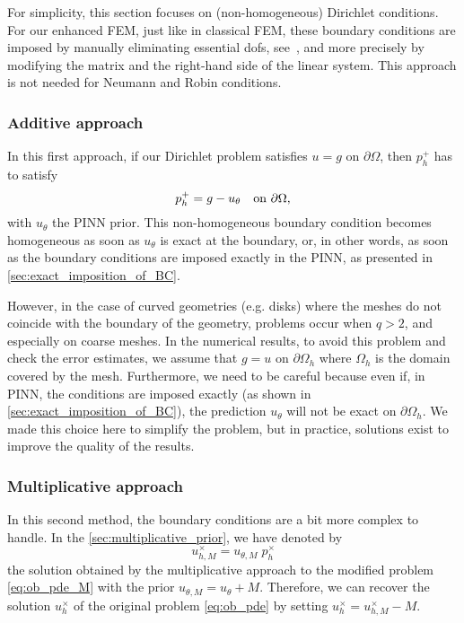 \begin{remark}
    For simplicity, this section focuses on (non-homogeneous) Dirichlet conditions.
    For our enhanced FEM, just like in classical FEM,
    these boundary conditions are imposed by manually eliminating essential dofs, see~\cite{Ern2004TheoryAP}, and more precisely by modifying the matrix and the right-hand side of the linear system. This approach is not needed for Neumann and Robin conditions.
\end{remark}

\subsubsection{Additive approach}\label{sec:additive_BC}

In this first approach, if our Dirichlet problem satisfies
$u=g$ on $\partial \Omega$,
then $p_h^+$ has to satisfy
\[
    p_h^+ = g - u_{\theta} \text{\quad on } \partial \Omega,
\]
with $u_\theta$ the PINN prior.
This non-homogeneous boundary condition becomes homogeneous as soon as $u_\theta$ is exact at the boundary, or, in other words, as soon as the boundary conditions are imposed exactly in the PINN, as presented in \cref{sec:exact_imposition_of_BC}.

\begin{remark}\label{rem:bconcurved}
    However, in the case of curved geometries (e.g. disks) where the meshes do not coincide with the boundary of the geometry, problems occur when $q>2$, and especially on coarse meshes. In the numerical results, to avoid this problem and check the error estimates, we assume that $g=u$ on $\partial\Omega_h$ where $\Omega_h$ is the domain covered by the mesh. Furthermore, we need to be careful because even if, in PINN, the conditions are imposed exactly (as shown in \cref{sec:exact_imposition_of_BC}), the prediction $u_\theta$ will not be exact on $\partial\Omega_h$. We made this choice here to simplify the problem, but in practice, solutions exist to improve the quality of the results.
\end{remark}

\subsubsection{Multiplicative approach}\label{sec:multiplicative_BC}

In this second method, the boundary conditions are a bit more complex to handle. In the \cref{sec:multiplicative_prior}, we have denoted by
\[
    u_{h,M}^\times = u_{\theta,M} \; p_h^\times
\]
the solution obtained by the multiplicative approach to the modified problem \eqref{eq:ob_pde_M} with the prior $u_{\theta,M}=u_\theta+M$. Therefore, we can recover the solution $u_h^\times$ of the original problem \eqref{eq:ob_pde} by setting $u_h^\times = u_{h,M}^\times - M$.

